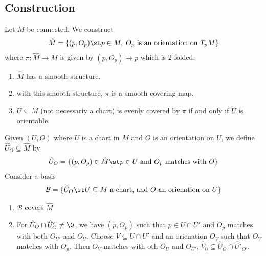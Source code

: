 \documentclass[11pt]{article}
\begin{document}
\subsection*{Construction}
\label{sec:orge1db716}
Let \(M\) be connected. We construct\\
\begin{align*}
  \hat{M}
  =\{(p,O_{p})\st p\in M,\;O_{p}\text{ is an orientation on }T_{p}M\}
\end{align*}
where \(\pi:\hat{M}\to M\) is given by \((p,O_{p})\mapsto p\) which is 2-folded.\\
\begin{enumerate}
\item \(\hat{M}\) has a smooth structure.\\
\item with this smooth structure, \(\pi\) is a smooth covering map.\\
\item \(U\subseteq M\) (not necessariy a chart) is evenly covered by \(\pi\) if and only if \(U\) is orientable.\\
\end{enumerate}

Given \((U,O)\) where \(U\) is a chart in \(M\) and \(O\) is an orientation on \(U\), we define \(\hat{U}_{O}\subseteq\hat{M}\) by\\
\begin{align*}
  \hat{U}_{O}
  =\{(p,O_{p})\in\hat{M}\st p\in U\text{ and }O_{p}\text{ matches with }O\}
\end{align*}
Consider a basis\\
\begin{align*}
  \mathcal{B}=\{\hat{U}_{O}\st U\subseteq M\text{ a chart, and }O\text{ an orienation on }U\}
\end{align*}
\begin{enumerate}
\item \(\mathcal{B}\) covers \(\hat{M}\)\\
\item For \(\hat{U}_{O}\cap \hat{U}_{O}'\neq\0\), we have \((p,O_{p})\) such that \(p\in U\cap U'\) and \(O_{p}\) matches with both \(O_{U'}\) and \(O_{U}\). Choose \(V\subseteq U\cap U'\) and an orienation \(O_{V}\) such that \(O_{V}\) matches with \(O_{p}\). Then \(O_{V}\) matches with oth \(O_{U}\) and \(O_{U'}\), \(\hat{V}_{0}\subseteq \hat{U}_{O}\cap\hat{U}'_{O'}\).\\
\end{enumerate}
\end{document}
